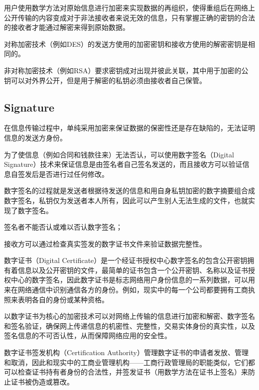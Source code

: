 用户使用数学方法对原始信息进行加密来实现数据的再组织，使得重组后在网络上公开传输的内容变成对于非法接收者来说无效的信息，只有掌握正确的密钥的合法的接收者才能通过解密来得到原始数据。

\begin{compactitem}
\item 对称加密技术（例如DES）的发送方使用的加密密钥和接收方使用的解密密钥是相同的。

\item 非对称加密技术（例如RSA）要求密钥成对出现并彼此关联，其中用于加密的公钥可以对外界公开，但是用于解密的私钥必须由接收者自己保管。
\end{compactitem}

\subsection{Signature}

在信息传输过程中，单纯采用加密来保证数据的保密性还是存在缺陷的，无法证明信息的发送方身份。

为了使信息（例如合同和钱款往来）无法否认，可以使用数字签名（Digital Signature）技术来保证信息是由签名者自己签名发送的，而且接收方可以验证信息自签发后是否进行过任何修改。

数字签名的过程就是发送者根据待发送的信息和用自身私钥加密的数字摘要组合成数字签名，私钥仅为发送者本人所有，因此可以产生别人无法生成的文件，也就实现了数字签名。



\begin{compactitem}
\item 签名者不能否认或难以否认数字签名；
\item 接收方可以通过检查真实签发的数字证书文件来验证数据完整性。
\end{compactitem}

数字证书（Digital Certificate）是一个经证书授权中心数字签名的包含公开密钥拥有着信息以及公开密钥的文件，最简单的证书包含一个公开密钥、名称以及证书授权中心的数字签名，因此数字证书是标志网络用户身份信息的一系列数据，可以用来在网络通信中识别通信各方的身份。例如，现实中的每一个公司都要拥有工商执照来表明各自的身份或某种资格。

以数字证书为核心的加密技术可以对网络上传输的信息进行加密和解密、数字签名和签名验证，确保网上传递信息的机密性、完整性，交易实体身份的真实性，以及签名信息的不可否认性，从而保障网络应用的安全性。

数字证书签发机构（Certification Authority）管理数字证书的申请者发放、管理和取消，因此和现实中的工商业管理机构——工商行政管理局的职能类似，它们都可以检查证书持有者身份的合法性，并签发证书（用数学方法在证书上签名）来防止证书被伪造或篡改。

